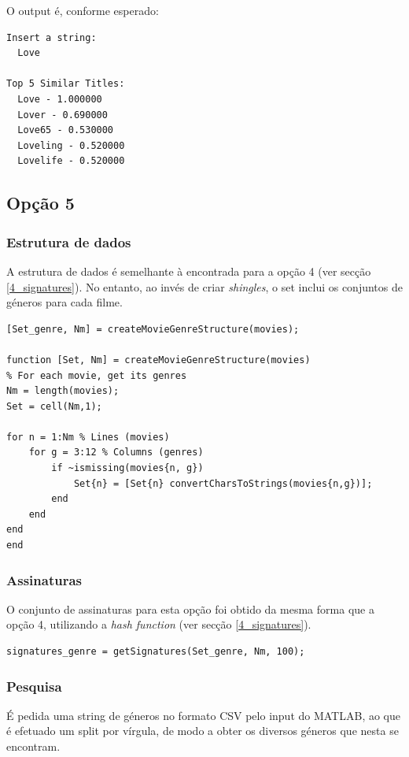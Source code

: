 \documentclass[portuguese, 11pt, a4paper,titlepage, oneside]{article}
\begin{document}
O output é, conforme esperado:
\begin{lstlisting}[style=Matlab-editor]
Insert a string: 
  Love

Top 5 Similar Titles:
  Love - 1.000000
  Lover - 0.690000
  Love65 - 0.530000
  Loveling - 0.520000
  Lovelife - 0.520000
\end{lstlisting}

\subsection{Opção 5}
\subsubsection{Estrutura de dados}
A estrutura de dados é semelhante à encontrada para a opção 4 (ver secção \ref{4_signatures}). No entanto, ao invés de criar \textit{shingles}, o set inclui os conjuntos de géneros para cada filme.

\begin{lstlisting}[style=Matlab-editor]
[Set_genre, Nm] = createMovieGenreStructure(movies);

function [Set, Nm] = createMovieGenreStructure(movies)
% For each movie, get its genres
Nm = length(movies);
Set = cell(Nm,1);

for n = 1:Nm % Lines (movies)
    for g = 3:12 % Columns (genres)
        if ~ismissing(movies{n, g})
            Set{n} = [Set{n} convertCharsToStrings(movies{n,g})];
        end
    end
end
end
\end{lstlisting}

\subsubsection{Assinaturas}
O conjunto de assinaturas para esta opção foi obtido da mesma forma que a opção 4, utilizando a \textit{hash function} (ver secção \ref{4_signatures}).

\begin{lstlisting}[style=Matlab-editor]
signatures_genre = getSignatures(Set_genre, Nm, 100);
\end{lstlisting}

\subsubsection{Pesquisa}
É pedida uma string de géneros no formato CSV pelo input do MATLAB, ao que é efetuado um split por vírgula, de modo a obter os diversos géneros que nesta se encontram.
\end{document}

